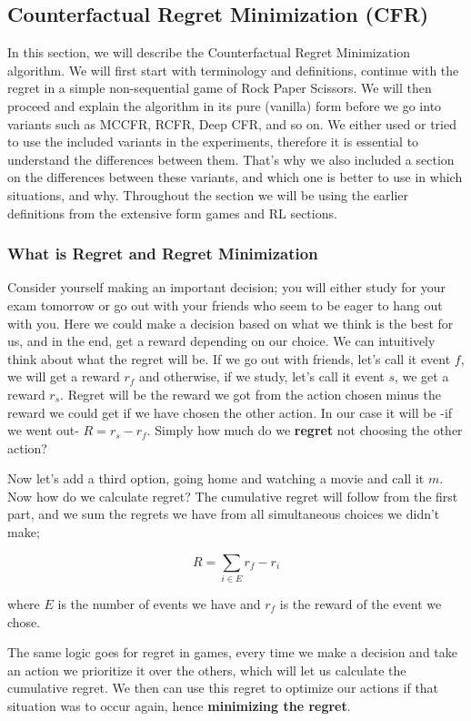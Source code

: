 \subsection{Counterfactual Regret Minimization (CFR)}

In this section, we will describe the Counterfactual Regret Minimization algorithm.
We will first start with terminology and definitions, continue with the regret in 
a simple non-sequential game of Rock Paper Scissors. We will then proceed and explain
the algorithm in its pure (vanilla) form before we go into variants such as 
MCCFR, RCFR, Deep CFR, and so on. We either used or tried to use the included 
variants in the experiments, therefore it is essential to understand the differences
between them. That's why we also included a section on the differences between these
variants, and which one is better to use in which situations, and why.
Throughout the section we will be using the earlier definitions from the
extensive form games and RL sections. 

\subsubsection{What is Regret and Regret Minimization} %
\label{sub:regret}
Consider yourself making an important decision; you will either study for your exam tomorrow
or go out with your friends who seem to be eager to hang out with you. Here
we could make a decision based on what we think is the best for us, and in the end, 
get a reward depending on our choice. We can intuitively think about what the regret will be. 
If we go out with friends, let's call it event $f$, we will get a reward $r_f$
and otherwise, if we study, let's call it event $s$, we get a reward $r_s$. Regret
will be the reward we got from the action chosen minus the reward we could get if we
have chosen the other action. In our case it will be -if we went out- $R = r_s - r_f$.
Simply how much do we \textbf{regret} not choosing the other action? 

Now let's add a third option, going home and watching a movie and call it $m$.
Now how do we calculate regret? The cumulative regret will follow from the first
part, and we sum the regrets we have from all simultaneous choices we 
didn't make;

$$R= \sum_{i\in E}{r_f-r_i}$$

where $E$ is the number of events we have and $r_f$ is the reward of the event we chose. 

The same logic goes for regret in games, every time we make a decision and take an action
we prioritize it over the others, which will let us calculate the cumulative regret.
We then can use this regret to optimize our actions if that situation was to occur again,
hence \textbf{minimizing the regret}.

